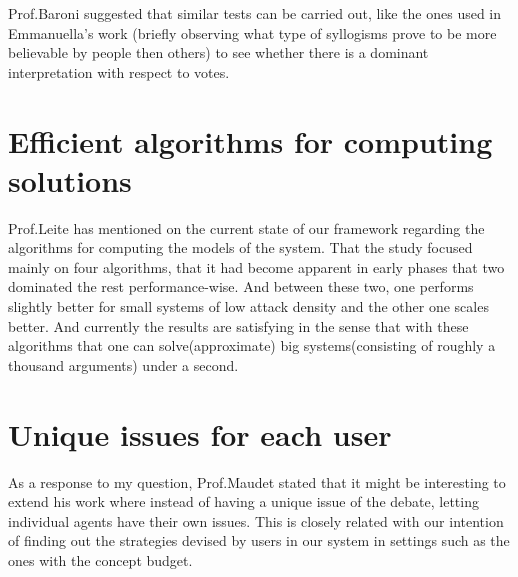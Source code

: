 \documentclass{article}
\begin{document}
Prof.Baroni suggested that similar tests can be carried out, like the ones used in Emmanuella's work (briefly observing what type of syllogisms prove to be more believable by people then others) to see whether there is a dominant interpretation with respect to votes. 


\section{Efficient algorithms for computing solutions}
Prof.Leite has mentioned on the current state of our framework regarding the algorithms for computing the models of the system. That the study focused mainly on four algorithms, that it had become apparent in early phases that two dominated the rest performance-wise. And between these two, one performs slightly better for small systems of low attack density and the other one scales better. And currently the results are satisfying in the sense that with these algorithms that one can solve(approximate) big systems(consisting of roughly a thousand arguments) under a second.


\section{Unique issues for each user}
As a response to my question, Prof.Maudet stated that it might be interesting to extend his work where instead of having a unique issue of the debate, letting individual agents have their own issues. This is closely related with our intention of finding out the strategies devised by users in our system in settings such as the ones with the concept budget.



\end{document}
